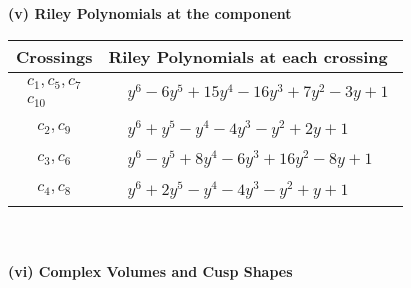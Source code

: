 \documentclass[1p]{elsarticle_modified}
\theoremstyle{definition}
\begin{document}
\newpage\renewcommand{\arraystretch}{1}
\flushleft \textbf{(v) Riley Polynomials at the component}\newline \\
\begin{tabular}{m{50pt}|m{274pt}}
Crossings & \hspace{64pt}Riley Polynomials at each crossing \\
\hline $$\begin{aligned}c_{1},c_{5},c_{7}\\c_{10}\end{aligned}$$&$\begin{aligned}
&y^6-6 y^5+15 y^4-16 y^3+7 y^2-3 y+1
\end{aligned}$\\
\hline $$\begin{aligned}c_{2},c_{9}\end{aligned}$$&$\begin{aligned}
&y^6+y^5- y^4-4 y^3- y^2+2 y+1
\end{aligned}$\\
\hline $$\begin{aligned}c_{3},c_{6}\end{aligned}$$&$\begin{aligned}
&y^6- y^5+8 y^4-6 y^3+16 y^2-8 y+1
\end{aligned}$\\
\hline $$\begin{aligned}c_{4},c_{8}\end{aligned}$$&$\begin{aligned}
&y^6+2 y^5- y^4-4 y^3- y^2+y+1
\end{aligned}$\\
\hline
\end{tabular}\\~\\
\newpage\flushleft \textbf{(vi) Complex Volumes and Cusp Shapes}
\end{document}
